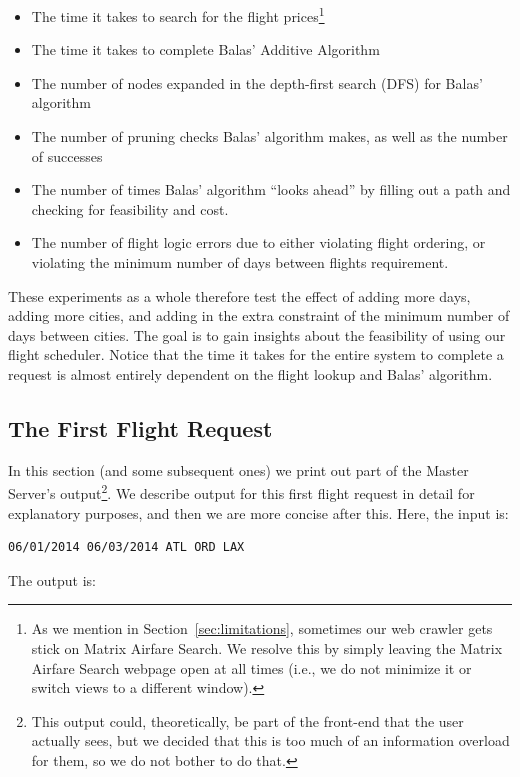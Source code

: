 \documentclass{article}
\begin{document}
\begin{itemize}[noitemsep]
    \item The time it takes to search for the flight prices\footnote{As we mention in Section~\ref{sec:limitations}, sometimes our web crawler gets
    stick on Matrix Airfare Search. We resolve this by simply leaving the Matrix Airfare Search webpage open at all times (i.e., we do not minimize it
    or switch views to a different window).}
    \item The time it takes to complete Balas' Additive Algorithm
    \item The number of nodes expanded in the depth-first search (DFS) for Balas' algorithm
    \item The number of pruning checks Balas' algorithm makes, as well as the number of successes
    \item The number of times Balas' algorithm ``looks ahead'' by filling out a path and checking for feasibility and cost.
    \item The number of flight logic errors due to either violating flight ordering, or violating the minimum number of days between flights
    requirement.
\end{itemize}

These experiments as a whole therefore test the effect of adding more days, adding more cities, and adding in the extra constraint of the minimum
number of days between cities. The goal is to gain insights about the feasibility of using our flight scheduler. Notice that the time it takes for the
entire system to complete a request is almost entirely dependent on the flight lookup and Balas' algorithm.


\subsection{The First Flight Request}\label{app:first_flight_request}

In this section (and some subsequent ones) we print out part of the Master Server's output\footnote{This output could, theoretically, be part of the
front-end that the user actually sees, but we decided that this is too much of an information overload for them, so we do not bother to do that.}.  We
describe output for this first flight request in detail for explanatory purposes, and then we are more concise after this. Here, the input is:

\begin{verbatim}
06/01/2014 06/03/2014 ATL ORD LAX
\end{verbatim}
The output is:
\end{document}
